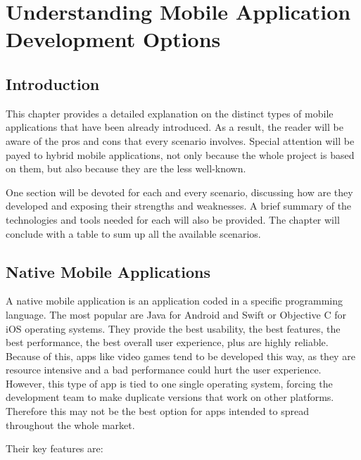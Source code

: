 \chapter{Understanding Mobile Application Development Options}
\justifying
\section{Introduction}

This chapter provides a detailed explanation on the distinct types of mobile applications that have been already introduced. As a result, the reader will be aware of the pros and cons that every scenario involves. Special attention will be payed to hybrid mobile applications, not only because the whole project is based on them, but also because they are the less well-known.

One section will be devoted for each and every scenario, discussing how are they developed and exposing their strengths and weaknesses. A brief summary of the technologies and tools needed for each will also be provided. The chapter will conclude with a table to sum up all the available scenarios.

\section{Native Mobile Applications}

A native mobile application is an application coded in a specific programming language. The most popular are Java for Android and Swift or Objective C for iOS operating systems. They provide the best usability, the best features, the best performance, the best overall user experience, plus are highly reliable. Because of this, apps like video games tend to be developed this way, as they are resource intensive and a bad performance could hurt the user experience. However, this type of app is tied to one single operating system, forcing the development team to make duplicate versions that work on other platforms. Therefore this may not be the best option for apps intended to spread throughout the whole market.

Their key features are:

